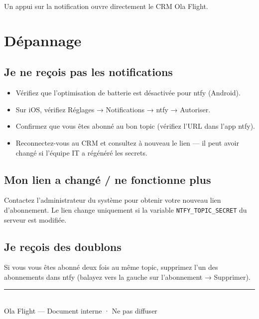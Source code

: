 \documentclass[a4paper, 11pt]{article}
\begin{document}
\medskip
Un appui sur la notification ouvre directement le CRM Ola Flight.

\section{Dépannage}

\subsection*{Je ne reçois pas les notifications}
\begin{itemize}[leftmargin=*, itemsep=0.2em]
  \item Vérifiez que l'optimisation de batterie est désactivée pour ntfy (Android).
  \item Sur iOS, vérifiez Réglages → Notifications → ntfy → Autoriser.
  \item Confirmez que vous êtes abonné au bon topic (vérifiez l'URL dans l'app ntfy).
  \item Reconnectez-vous au CRM et consultez à nouveau le lien — il peut avoir changé si l'équipe IT a régénéré les secrets.
\end{itemize}

\subsection*{Mon lien a changé / ne fonctionne plus}
Contactez l'administrateur du système pour obtenir votre nouveau lien d'abonnement.
Le lien change uniquement si la variable \texttt{NTFY\_TOPIC\_SECRET} du serveur est modifiée.

\subsection*{Je reçois des doublons}
Si vous vous êtes abonné deux fois au même topic, supprimez l'un des abonnements dans ntfy
(balayez vers la gauche sur l'abonnement → Supprimer).

\vfill
\begin{center}
  \textcolor{olaLight}{\rule{6cm}{0.3pt}}\\[0.8em]
  {\small\color{olaGrey} Ola Flight — Document interne · Ne pas diffuser}
\end{center}
\end{document}
